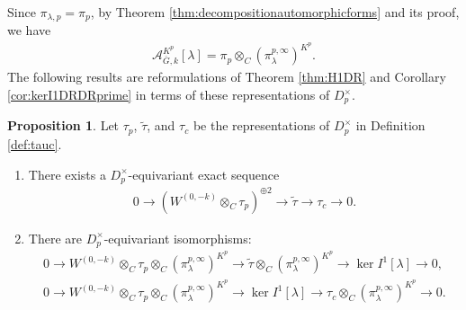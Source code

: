 \documentclass{article}
\theoremstyle{definition}
\newtheorem{proposition}[theorem]{Proposition}
\def\calA{\mathcal{A}}
\DeclareMathOperator{\ox}{\otimes}
\def\bar{\overline}
\def\tilde{\widetilde}
\begin{document}
Since $\pi_{\lambda,p}=\pi_p$, by Theorem \ref{thm:decompositionautomorphicforms} and its proof, we have
\begin{align}\label{equationmultiplicity}
    \calA_{\bar G,k}^{K^p}[\lambda]=\pi_p\otimes_C (\pi_{\lambda}^{p,\infty})^{K^p}.
\end{align}
The following results are reformulations of Theorem \ref{thm:H1DR} and Corollary \ref{cor:kerI1DRDRprime} in terms of these representations of $D_p^{\times}$.
\begin{proposition}\label{propositionexactseqDptimesrep}
    Let $\tau_p$, $\tilde{\tau}$, and $\tau_c$ be the representations of $D_p^{\times}$ in Definition \ref{def:tauc}.
    \begin{enumerate}[(1)]
        \item There exists a $D_p^\times$-equivariant exact sequence 
        \begin{align}\label{equationexactsequencetautildetuac}
            0\to (W^{(0,-k)}\ox_C \tau_p )^{\oplus 2}\to  \tilde{\tau}\to \tau_c \to 0.
        \end{align}
        \item There are $D_p^\times$-equivariant isomorphisms:
        \[\begin{array}{c}
        0\to W^{(0,-k)}\ox_C \tau_p\otimes_C (\pi_{\lambda}^{p,\infty})^{K^p} \to  \tilde{\tau}\otimes_C (\pi_{\lambda}^{p,\infty})^{K^p} \to \ker I^1[\lambda]\to 0,\\
        0\to W^{(0,-k)}\ox_C \tau_p\otimes_C (\pi_{\lambda}^{p,\infty})^{K^p} \to \ker I^1[\lambda]\to \tau_c \otimes_C (\pi_{\lambda}^{p,\infty})^{K^p}\to 0.
    \end{array}\]
    \end{enumerate}
\end{proposition} 
\end{document}

